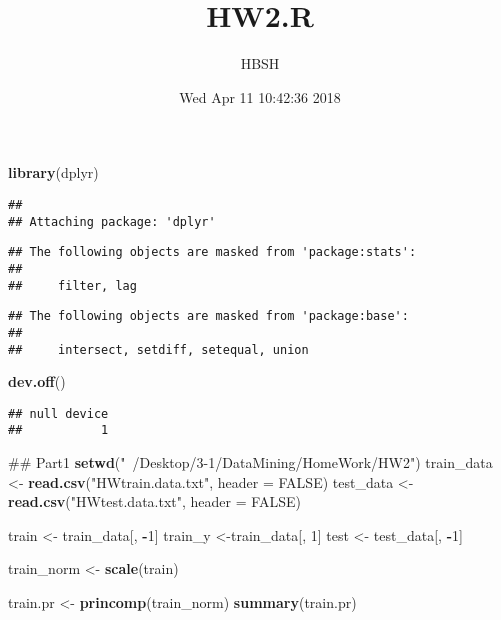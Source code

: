 \documentclass[]{article}
\title{HW2.R}
\author{HBSH}
\date{Wed Apr 11 10:42:36 2018}
\newenvironment{Shaded}{\begin{snugshade}}{\end{snugshade}}
\newcommand{\KeywordTok}[1]{\textcolor[rgb]{0.13,0.29,0.53}{\textbf{#1}}}
\newcommand{\DataTypeTok}[1]{\textcolor[rgb]{0.13,0.29,0.53}{#1}}
\newcommand{\DecValTok}[1]{\textcolor[rgb]{0.00,0.00,0.81}{#1}}
\newcommand{\StringTok}[1]{\textcolor[rgb]{0.31,0.60,0.02}{#1}}
\newcommand{\OtherTok}[1]{\textcolor[rgb]{0.56,0.35,0.01}{#1}}
\newcommand{\OperatorTok}[1]{\textcolor[rgb]{0.81,0.36,0.00}{\textbf{#1}}}
\newcommand{\NormalTok}[1]{#1}
\begin{document}
\maketitle

\begin{Shaded}
\begin{Highlighting}[]
\KeywordTok{library}\NormalTok{(dplyr)}
\end{Highlighting}
\end{Shaded}

\begin{verbatim}
## 
## Attaching package: 'dplyr'
\end{verbatim}

\begin{verbatim}
## The following objects are masked from 'package:stats':
## 
##     filter, lag
\end{verbatim}

\begin{verbatim}
## The following objects are masked from 'package:base':
## 
##     intersect, setdiff, setequal, union
\end{verbatim}

\begin{Shaded}
\begin{Highlighting}[]
\KeywordTok{dev.off}\NormalTok{()}
\end{Highlighting}
\end{Shaded}

\begin{verbatim}
## null device 
##           1
\end{verbatim}

\begin{Shaded}
\begin{Highlighting}[]
\NormalTok{## Part1}
\KeywordTok{setwd}\NormalTok{(}\StringTok{"~/Desktop/3-1/DataMining/HomeWork/HW2"}\NormalTok{)}
\NormalTok{train_data <-}\StringTok{ }\KeywordTok{read.csv}\NormalTok{(}\StringTok{"HWtrain.data.txt"}\NormalTok{, }\DataTypeTok{header =} \OtherTok{FALSE}\NormalTok{)}
\NormalTok{test_data <-}\StringTok{ }\KeywordTok{read.csv}\NormalTok{(}\StringTok{"HWtest.data.txt"}\NormalTok{, }\DataTypeTok{header =} \OtherTok{FALSE}\NormalTok{)}

\NormalTok{train <-}\StringTok{ }\NormalTok{train_data[, }\OperatorTok{-}\DecValTok{1}\NormalTok{]}
\NormalTok{train_y <-train_data[, }\DecValTok{1}\NormalTok{]}
\NormalTok{test <-}\StringTok{ }\NormalTok{test_data[, }\OperatorTok{-}\DecValTok{1}\NormalTok{]}

\NormalTok{train_norm <-}\StringTok{ }\KeywordTok{scale}\NormalTok{(train)}

\NormalTok{train.pr <-}\StringTok{ }\KeywordTok{princomp}\NormalTok{(train_norm)}
\KeywordTok{summary}\NormalTok{(train.pr)}
\end{Highlighting}
\end{Shaded}
\end{document}

